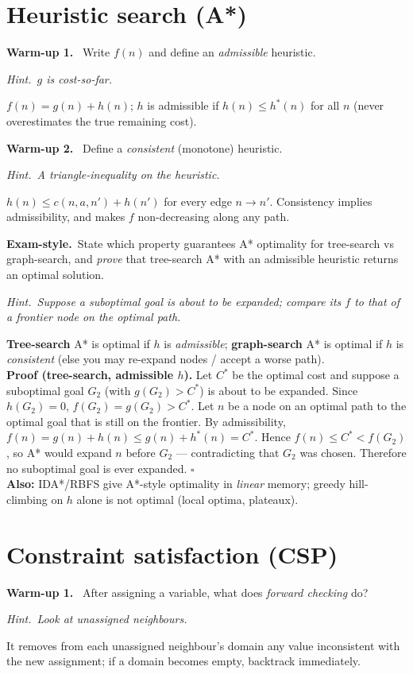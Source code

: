 \documentclass[11pt,a4paper]{article}
\newcommand{\hint}[1]{\par{\small\textcolor{accent}{\textit{Hint.}}\ \textit{#1}}\par\smallskip}
\newcommand{\warm}[1]{\smallskip\textbf{\textcolor{hi}{Warm-up #1.}}\ }
\newcommand{\exam}{\smallskip\textbf{\textcolor{warn}{Exam-style.}}\ }
\begin{document}
\section{Heuristic search (A*)}

\warm{1} Write $f(n)$ and define an \emph{admissible} heuristic.
\hint{$g$ is cost-so-far.}
\begin{sol}$f(n)=g(n)+h(n)$; $h$ is admissible if $h(n)\le h^*(n)$ for all $n$ (never overestimates the true remaining cost).\end{sol}

\warm{2} Define a \emph{consistent} (monotone) heuristic.
\hint{A triangle-inequality on the heuristic.}
\begin{sol}$h(n)\le c(n,a,n')+h(n')$ for every edge $n\to n'$. Consistency implies admissibility, and makes $f$ non-decreasing along any path.\end{sol}

\exam State which property guarantees A* optimality for tree-search vs graph-search, and \emph{prove} that tree-search A* with an admissible heuristic returns an optimal solution.
\hint{Suppose a suboptimal goal is about to be expanded; compare its $f$ to that of a frontier node on the optimal path.}
\begin{sol}
\textbf{Tree-search} A* is optimal if $h$ is \emph{admissible}; \textbf{graph-search} A* is optimal if $h$ is \emph{consistent} (else you may re-expand nodes / accept a worse path).\\[3pt]
\textbf{Proof (tree-search, admissible $h$).} Let $C^*$ be the optimal cost and suppose a suboptimal goal $G_2$ (with $g(G_2)>C^*$) is about to be expanded. Since $h(G_2)=0$, $f(G_2)=g(G_2)>C^*$. Let $n$ be a node on an optimal path to the optimal goal that is still on the frontier. By admissibility, $f(n)=g(n)+h(n)\le g(n)+h^*(n)=C^*$. Hence $f(n)\le C^*<f(G_2)$, so A* would expand $n$ before $G_2$ --- contradicting that $G_2$ was chosen. Therefore no suboptimal goal is ever expanded. $\square$\\[3pt]
\textbf{Also:} IDA*/RBFS give A*-style optimality in \emph{linear} memory; greedy hill-climbing on $h$ alone is not optimal (local optima, plateaux).
\end{sol}

\section{Constraint satisfaction (CSP)}

\warm{1} After assigning a variable, what does \emph{forward checking} do?
\hint{Look at unassigned neighbours.}
\begin{sol}It removes from each unassigned neighbour's domain any value inconsistent with the new assignment; if a domain becomes empty, backtrack immediately.\end{sol}
\end{document}
